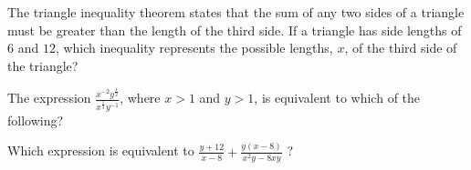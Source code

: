 \vspace{0.75em}



\vspace{2em}



\noindent\markforreview

\vspace{1em}

The triangle inequality theorem states that the sum of any two sides of a triangle must be greater than the length of the third side. If a triangle has side lengths of $6$ and $12$, which inequality represents the possible lengths, $x$, of the third side of the triangle?

\vspace{0.75em}



\newpage
\noindent\markforreview
\vspace{1em}

The expression \(\frac{x^{-2}y^{\frac{1}{2}}}{x^{\frac{1}{3}}y^{-1}}\), where \(x > 1\) and \(y > 1\), is equivalent to which of the following?

\vspace{0.75em}


\newpage
\noindent\markforreview
\vspace{1em}

Which expression is equivalent to \(\frac{y + 12}{x - 8} + \frac{y(x - 8)}{x^2 y - 8xy}\) ?



\vspace{0.75em}



\vspace{2em}

